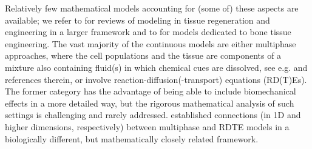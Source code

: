 \documentclass[a4paper,10pt]{article}
\theoremstyle{definition}
\begin{document}
\noindent
Relatively few mathematical models accounting for (some of) these aspects are available; we refer to \cite{ODea2012,WSE-H} for reviews of modeling in tissue regeneration and engineering in a larger framework and to \cite{Burova2019} for models dedicated to bone tissue engineering. The vast majority of the continuous models are either multiphase approaches, where the cell populations and the tissue are components of a mixture also containing fluid(s) in which chemical cues are dissolved, see e.g.  \cite{klika2016overview,Borgiani2017} and references therein, or involve reaction-diffusion(-transport) equations (RD(T)Es). The former category has the advantage of being able to include biomechanical effects in a more detailed way, but the rigorous mathematical analysis of such settings is challenging and rarely addressed. \cite{jackson2002mechanical,Kumar2022} established connections (in 1D and higher dimensions, respectively) between multiphase and RDTE models in a biologically different, but mathematically closely related framework. 
\end{document}
